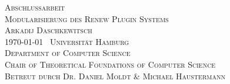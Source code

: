 \begin{titlepage}	
\vspace*{100px}

\begin{center}
	\vspace{5em}
	{\Large \textsc{Abschlussarbeit}}\\
	\vspace{5em}
	{\huge \textsc{Modularisierung des \textsc{Renew} Plugin Systems}}\\
	\vspace{4em}
	{\Large \textsc{Arkadij Daschkewitsch}}\\
	\vspace{3em}
	{\Large \textsc{\today}}\
	\vspace{3em}
	{\Large \textsc{Universität Hamburg}}\\
	\vspace{1em}
	{\Large \textsc{Department of Computer Science}}\\
	\vspace{1em}
	{\Large \textsc{Chair of Theoretical Foundations of Computer Science}}\\
	\vspace{2em}
	{\Large \textsc{Betreut durch Dr. Daniel Moldt \& Michael Haustermann}}\\
\end{center}
\end{titlepage}